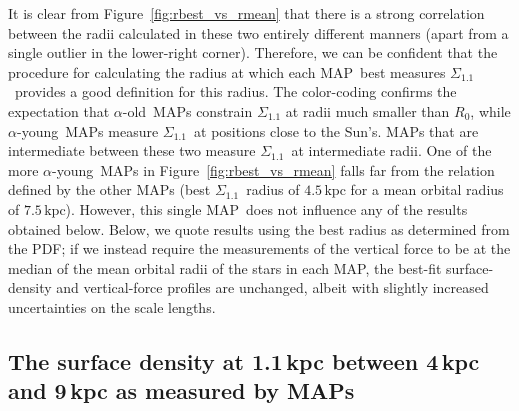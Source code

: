 \documentclass{emulateapj}
\renewcommand{\figurename}{Figure}
\newcommand{\apoor}{\ensuremath{\alpha}-young}
\newcommand{\aenhanced}{\ensuremath{\alpha}-old}
\newcommand{\map}{MAP}
\newcommand{\kpc}{\ensuremath{\,\mathrm{kpc}}}
\newcommand{\sigoneone}{\ensuremath{\Sigma_{1.1}}}
\begin{document}
It is clear from \figurename~\ref{fig:rbest_vs_rmean} that there is a
strong correlation between the radii calculated in these two entirely
different manners (apart from a single outlier in the lower-right
corner). Therefore, we can be confident that the procedure for
calculating the radius at which each \map\ best measures
\sigoneone\ provides a good definition for this radius. The
color-coding confirms the expectation that \aenhanced\ \map s
constrain $\sigoneone$ at radii much smaller than $R_0$, while
\apoor\ \map s measure \sigoneone\ at positions close to the
Sun's. \map s that are intermediate between these two measure
\sigoneone\ at intermediate radii. One of the more \apoor\ \map s in
\figurename~\ref{fig:rbest_vs_rmean} falls far from the relation
defined by the other \map s (best \sigoneone\ radius of $4.5\kpc$ for
a mean orbital radius of $7.5\kpc$). However, this single \map\ does
not influence any of the results obtained below. Below, we quote
results using the best radius as determined from the PDF; if we
instead require the measurements of the vertical force to be at the
median of the mean orbital radii of the stars in each \map, the
best-fit surface-density and vertical-force profiles are unchanged,
albeit with slightly increased uncertainties on the scale lengths.


\subsection{The surface density at 1.1\,kpc between 4\,kpc and 9\,kpc as measured by \map s}\label{sec:surfresults}
\end{document}
